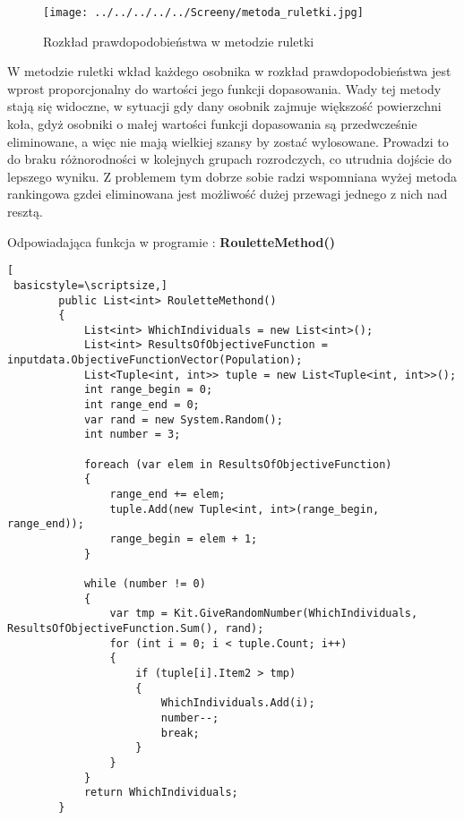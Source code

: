 \begin{figure}[h]
		\texttt{[image: ../../../../../Screeny/metoda\_ruletki.jpg]}
		\caption{Rozkład prawdopodobieństwa w metodzie ruletki}
		\label{ruletka}			
\end{figure}
\par
W metodzie ruletki wkład każdego osobnika w rozkład prawdopodobieństwa jest wprost proporcjonalny do wartości jego funkcji dopasowania. Wady tej metody stają się widoczne, w sytuacji gdy dany osobnik zajmuje większość powierzchni koła, gdyż osobniki o małej wartości funkcji dopasowania są przedwcześnie eliminowane, a więc nie mają wielkiej szansy by zostać wylosowane. Prowadzi to do braku różnorodności w kolejnych grupach rozrodczych, co utrudnia dojście do lepszego wyniku. Z problemem tym dobrze sobie radzi wspomniana wyżej metoda rankingowa gzdei eliminowana jest możliwość dużej przewagi jednego z nich nad resztą.\\
\par
Odpowiadająca funkcja w programie : \textbf{RouletteMethod()}

\begin{program}
\begin{lstlisting}[
 basicstyle=\scriptsize,]
        public List<int> RouletteMethond()
        {
            List<int> WhichIndividuals = new List<int>();
            List<int> ResultsOfObjectiveFunction = inputdata.ObjectiveFunctionVector(Population);
            List<Tuple<int, int>> tuple = new List<Tuple<int, int>>();
            int range_begin = 0;
            int range_end = 0;
            var rand = new System.Random();
            int number = 3;

            foreach (var elem in ResultsOfObjectiveFunction)
            {
                range_end += elem;
                tuple.Add(new Tuple<int, int>(range_begin, range_end));
                range_begin = elem + 1;
            }

            while (number != 0)
            {
                var tmp = Kit.GiveRandomNumber(WhichIndividuals, ResultsOfObjectiveFunction.Sum(), rand);
                for (int i = 0; i < tuple.Count; i++)
                {
                    if (tuple[i].Item2 > tmp)
                    {
                        WhichIndividuals.Add(i);
                        number--;
                        break;
                    }
                }
            }
            return WhichIndividuals;
        }
\end{lstlisting}
\end{program}

